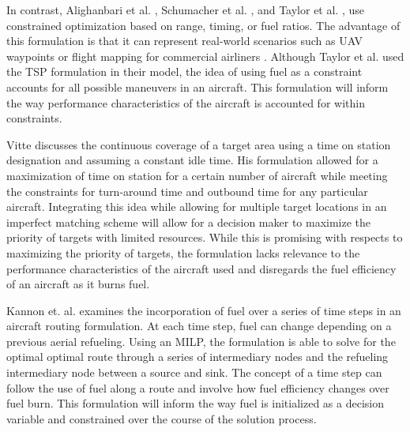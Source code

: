 In contrast, Alighanbari et al. \cite{Alighanbari}, Schumacher et al. \cite{Schumacher}, and Taylor et al. \cite{Taylor}, use constrained optimization based on range, timing, or fuel ratios. The advantage of this formulation is that it can represent real-world scenarios such as UAV waypoints \cite{Alighanbari} or flight mapping for commercial airliners \cite{Taylor}. Although Taylor et al. \cite{Taylor} used the TSP formulation in their model, the idea of using fuel as a constraint accounts for all possible maneuvers in an aircraft. This formulation will inform the way performance characteristics of the aircraft is accounted for within constraints.\par
Vitte \cite{OptimizeBreguet} discusses the continuous coverage of a target area using a time on station designation and assuming a constant idle time. His formulation allowed for a maximization of time on station for a certain number of aircraft while meeting the constraints for turn-around time and outbound time for any particular aircraft. Integrating this idea while allowing for multiple target locations in an imperfect matching scheme will allow for a decision maker to maximize the priority of targets with limited resources. While this is promising with respects to maximizing the priority of targets, the formulation lacks relevance to the performance characteristics of the aircraft used and disregards the fuel efficiency of an aircraft as it burns fuel.\par
Kannon et. al. \cite{Kannon} examines the incorporation of fuel over a series of time steps in an aircraft routing formulation. At each time step, fuel can change depending on a previous aerial refueling. Using an MILP, the formulation is able to solve for the optimal optimal route through a series of intermediary nodes and the refueling intermediary node between a source and sink. The concept of a time step can follow the use of fuel along a route and involve how fuel efficiency changes over fuel burn. This formulation will inform the way fuel is initialized as a decision variable and constrained over the course of the solution process.\par


